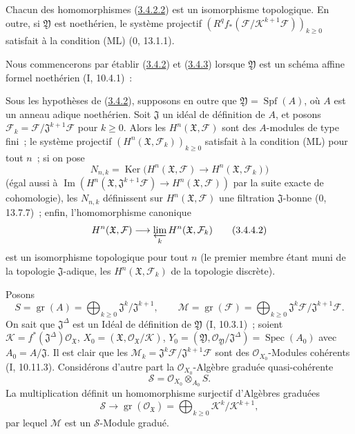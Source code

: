 \begin{corollary}[3.4.3]
\label{III.3.4.3-fr}
Chacun des homomorphismes (\hyperref[III.3.4.2.2-fr]{3.4.2.2}) est un
isomorphisme topologique. En outre, si $\mathfrak Y$ est noethérien, le
système projectif
$(R^qf_*(\mathcal F/\mathcal K^{k+1}\mathcal F))_{k\geq0}$ satisfait à la
condition (ML) (0, 13.1.1).
\end{corollary}

Nous commencerons par établir (\hyperref[III.3.4.2-fr]{3.4.2}) et
(\hyperref[III.3.4.3-fr]{3.4.3}) lorsque $\mathfrak Y$ est un schéma affine
formel noethérien (I, 10.4.1)~:

\begin{corollary}[3.4.4]
\label{III.3.4.4-fr}
Sous les hypothèses de (\hyperref[III.3.4.2-fr]{3.4.2}), supposons en outre
que $\mathfrak Y=\operatorname{Spf}(A)$, où $A$ est un anneau adique
noethérien. Soit $\mathfrak J$ un idéal de définition de $A$, et posons
$\mathcal F_k=\mathcal F/\mathfrak J^{k+1}\mathcal F$ pour $k\geq0$. Alors
les $H^n(\mathfrak X,\mathcal F)$ sont des $A$-modules de type fini~; le
système projectif $(H^n(\mathfrak X,\mathcal F_k))_{k\geq0}$ satisfait à la
condition (ML) pour tout $n$~; si on pose
\[
N_{n,k}=\operatorname{Ker}\bigl(H^n(\mathfrak X,\mathcal F)
\longrightarrow H^n(\mathfrak X,\mathcal F_k)\bigr)
\tag{3.4.4.1}\label{III.3.4.4.1-fr}
\]
(égal aussi à
$\operatorname{Im}(H^n(\mathfrak X,\mathfrak J^{k+1}\mathcal F)
\to H^n(\mathfrak X,\mathcal F))$ par la suite exacte de cohomologie), les
$N_{n,k}$ définissent sur $H^n(\mathfrak X,\mathcal F)$ une filtration
$\mathfrak J$-bonne (0, 13.7.7)~; enfin, l'homomorphisme canonique
\[
H^n(\mathfrak X,\mathcal F)
\longrightarrow\varprojlim_kH^n(\mathfrak X,\mathcal F_k)
\tag{3.4.4.2}\label{III.3.4.4.2-fr}
\]
est un isomorphisme topologique pour tout $n$ (le premier membre étant muni
de la topologie $\mathfrak J$-adique, les $H^n(\mathfrak X,\mathcal F_k)$ de
la topologie discrète).
\end{corollary}

Posons
\[
S=\operatorname{gr}(A)=\bigoplus_{k\geq0}
\mathfrak J^k/\mathfrak J^{k+1},\qquad
\mathcal M=\operatorname{gr}(\mathcal F)=\bigoplus_{k\geq0}
\mathfrak J^k\mathcal F/\mathfrak J^{k+1}\mathcal F.
\tag{3.4.4.3}\label{III.3.4.4.3-fr}
\]
On sait que $\mathfrak J^\Delta$ est un Idéal de définition de $\mathfrak Y$
(I, 10.3.1)~; soient
$\mathcal K=f^*(\mathfrak J^\Delta)\mathcal O_{\mathfrak X}$,
$X_0=(\mathfrak X,\mathcal O_{\mathfrak X}/\mathcal K)$,
$Y_0=(\mathfrak Y,\mathcal O_{\mathfrak Y}/\mathfrak J^\Delta)
=\operatorname{Spec}(A_0)$ avec $A_0=A/\mathfrak J$. Il est clair que les
$\mathcal M_k=\mathfrak J^k\mathcal F/\mathfrak J^{k+1}\mathcal F$ sont des
$\mathcal O_{X_0}$-Modules cohérents (I, 10.11.3). Considérons d'autre part la
$\mathcal O_{X_0}$-Algèbre graduée quasi-cohérente
\[
\mathcal S=\mathcal O_{X_0}\otimes_{A_0}S.
\tag{3.4.4.4}\label{III.3.4.4.4-fr}
\]
La multiplication définit un homomorphisme surjectif d'Algèbres graduées
\[
\mathcal S\longrightarrow
\operatorname{gr}(\mathcal O_{\mathfrak X})
=\bigoplus_{k\geq0}\mathcal K^k/\mathcal K^{k+1},
\]
par lequel $\mathcal M$ est un $\mathcal S$-Module gradué.

